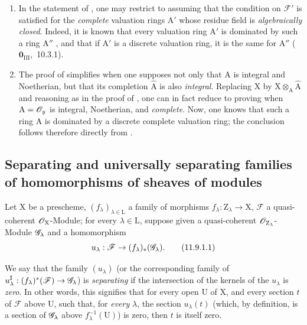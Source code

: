 \begin{remarks}[11.8.2]
\label{IV.11.8.2}
\medskip\noindent
\begin{enumerate}[label=(\roman*)]
  \item In the statement of , one may restrict to assuming that the condition on $\mathscr{F}'$ is satisfied for the \emph{complete} valuation rings $\mathrm{A}'$ whose residue field is \emph{algebraically closed}.
  Indeed, it is known that every valuation ring $\mathrm{A}'$ is dominated by such a ring $\mathrm{A}''$ , and that if $\mathrm{A}'$ is a discrete valuation ring, it is the same for $\mathrm{A}''$ ($\mathbf{0}_{\mathrm{III}}$,~10.3.1).
  \item The proof of  simplifies when one supposes not only that $\mathrm{A}$ is integral and Noetherian, but that its completion $\hat{\mathrm{A}}$ is also \emph{integral}.
  Replacing $\mathrm{X}$ by $\mathrm{X}\otimes_\mathrm{A}\hat{\mathrm{A}}$ and reasoning as in the proof of , one can in fact reduce to proving  when $\mathrm{A}=\mathscr{O}_y$ is integral, Noetherian, and \emph{complete}.
  Now, one knows  that such a ring $\mathrm{A}$ is dominated by a discrete complete valuation ring; the conclusion follows therefore directly from .
\end{enumerate}
\end{remarks}

\subsection{Separating and universally separating families of homomorphisms of sheaves of modules}
\label{subsection:IV.11.9}

\begin{env}[11.9.1]
\label{IV.11.9.1}
Let $\mathrm{X}$ be a prescheme, $(f_\lambda)_{\lambda\in\mathrm{L}}$ a family of morphisms $f_\lambda:\mathrm{Z}_\lambda\to\mathrm{X}$, $\mathscr{F}$ a quasi-coherent $\mathscr{O}_\mathrm{X}$-Module; for every $\lambda\in\mathrm{L}$, suppose given a quasi-coherent $\mathscr{O}_{\mathrm{Z}_\lambda}$-Module $\mathscr{G}_\lambda$ and a homomorphism
\[
  u_\lambda:\mathscr{F}\to(f_\lambda)_*(\mathscr{G}_\lambda).
\tag{11.9.1.1}\label{IV.11.9.1.1}
\]
\end{env}

We say that the family $(u_\lambda)$ (or the corresponding family of $u_\lambda^{\sharp}:(f_\lambda)^*(\mathscr{F})\to\mathscr{G}_\lambda$) is \emph{separating} if the intersection of the kernels of the $u_\lambda$ is \emph{zero}.
In other words, this signifies that for every open $\mathrm{U}$ of $\mathrm{X}$, and every section $t$ of $\mathscr{F}$ above $\mathrm{U}$, such that, for \emph{every} $\lambda$, the section $u_\lambda(t)$ (which, by definition, is a section of $\mathscr{G}_\lambda$ above $f_\lambda^{-1}(\mathrm{U})$) is zero, then $t$ is itself zero.


